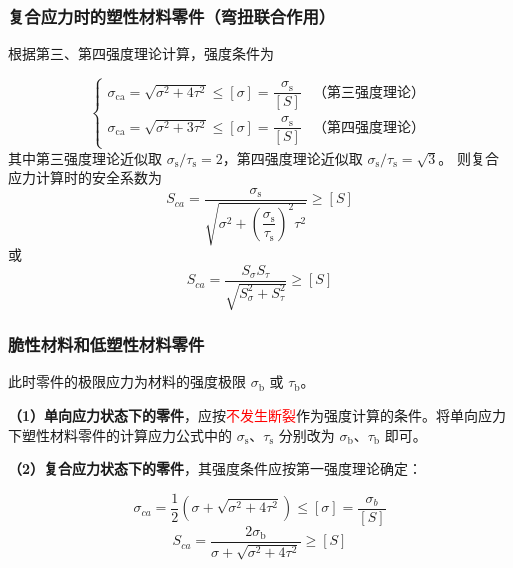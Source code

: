 \subsubsection{复合应力时的塑性材料零件（弯扭联合作用）}

根据第三、第四强度理论计算，强度条件为

\begin{theorem}[复合应力塑性材料零件的强度条件]
\label{thm:复合静应力强度}
\begin{equation}
	\begin{cases}
		\sigma_{\mathrm{ca}} = \sqrt{\sigma^2 + 4\tau^2} \le [\sigma] = \dfrac{\sigma_{\mathrm{s}}}{[S]} & \text{（第三强度理论）} \\[2ex]
		\sigma_{\mathrm{ca}} = \sqrt{\sigma^2 + 3\tau^2} \le [\sigma] = \dfrac{\sigma_{\mathrm{s}}}{[S]} & \text{（第四强度理论）}
	\end{cases}
	\label{eq:强度:复合静应力强度}
\end{equation}
其中第三强度理论近似取 $\sigma_{\mathrm{s}}/\tau_{\mathrm{s}}=2$，第四强度理论近似取 $\sigma_{\mathrm{s}}/\tau_{\mathrm{s}}=\sqrt{3}$。
则复合应力计算时的安全系数为
\begin{equation}
	S_{ca}=\frac{\sigma_{\mathrm{s}}}{\sqrt{\sigma^2+\left(\dfrac{\sigma_{\mathrm{s}}}{\tau_{\mathrm{s}}}\right)^2\tau^2}}\geq[S]
	\label{eq:强度:复合应力安全系数1}
\end{equation}
或
\begin{equation}
	S_{ca}=\frac{S_\sigma S_\tau}{\sqrt{S_\sigma^2+S_\tau^2}}\geq[S]
	\label{eq:强度:复合应力安全系数2}
\end{equation}
\end{theorem}

\subsubsection{脆性材料和低塑性材料零件}

此时零件的极限应力为材料的强度极限 $\sigma_{\mathrm{b}}$ 或 $\tau_{\mathrm{b}}$。

\textbf{（1）单向应力状态下的零件}，应按\textcolor{red}{不发生断裂}作为强度计算的条件。将单向应力下塑性材料零件的计算应力公式中的 $\sigma_{\mathrm{s}}$、$\tau_{\mathrm{s}}$ 分别改为 $\sigma_{\mathrm{b}}$、$\tau_{\mathrm{b}}$ 即可。

\textbf{（2）复合应力状态下的零件}，其强度条件应按第一强度理论确定：

\begin{theorem}[脆性材料复合应力零件的强度条件]
\label{thm:脆性复合应力强度}
\begin{equation}
	\sigma_{ca}=\frac{1}{2}\left(\sigma+\sqrt{\sigma^2+4\tau^2}\right)\le[\sigma]=\frac{\sigma_{b}}{[S]}
	\label{eq:强度:脆性复合应力强度}
\end{equation}
\begin{equation}
	S_{ca}=\frac{2\sigma_{\mathrm{b}}}{\sigma+\sqrt{\sigma^2+4\tau^2}}\geq[S]
	\label{eq:强度:脆性复合应力安全系数}
\end{equation}
\end{theorem}



